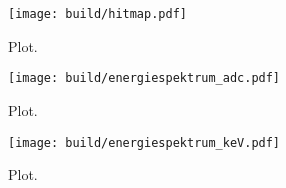 \begin{figure}
  \centering
  \texttt{[image: build/hitmap.pdf]}
  \caption{Plot.}
  \label{fig:hitmap}
\end{figure}

\begin{figure}
  \centering
  \texttt{[image: build/energiespektrum\_adc.pdf]}
  \caption{Plot.}
  \label{fig:energieadc}
\end{figure}

\begin{figure}
  \centering
  \texttt{[image: build/energiespektrum\_keV.pdf]}
  \caption{Plot.}
  \label{fig:energiekeV}
\end{figure}




